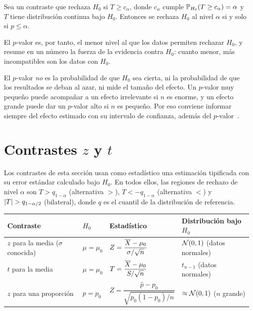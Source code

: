 \begin{proposicion}\label{prop:t5-pvalor}
Sea un contraste que rechaza $H_0$ si $T\ge c_\alpha$, donde $c_\alpha$ cumple $\mathbb{P}_{H_0}(T\ge c_\alpha)=\alpha$ y $T$ tiene distribución continua bajo $H_0$. Entonces se rechaza $H_0$ al nivel $\alpha$ si y solo si $p\le\alpha$.
\end{proposicion}

El $p$-valor es, por tanto, el menor nivel al que los datos permiten rechazar $H_0$, y resume en un número la fuerza de la evidencia contra $H_0$: cuanto menor, más incompatibles son los datos con $H_0$.

\begin{observacion}\label{obs:t5-pvalor}
El $p$-valor \emph{no} es la probabilidad de que $H_0$ sea cierta, ni la probabilidad de que los resultados se deban al azar, ni mide el tamaño del efecto. Un $p$-valor muy pequeño puede acompañar a un efecto irrelevante si $n$ es enorme, y un efecto grande puede dar un $p$-valor alto si $n$ es pequeño. Por eso conviene informar siempre del efecto estimado con su intervalo de confianza, además del $p$-valor~\cite[lecturas~17b y~20]{mit1805}.
\end{observacion}

\section{Contrastes \texorpdfstring{$z$}{z} y \texorpdfstring{$t$}{t}}

Los contrastes de esta sección usan como estadístico una estimación tipificada con su error estándar calculado bajo $H_0$. En todos ellos, las regiones de rechazo de nivel $\alpha$ son $T>q_{1-\alpha}$ (alternativa $>$), $T<-q_{1-\alpha}$ (alternativa $<$) y $\lvert T\rvert>q_{1-\alpha/2}$ (bilateral), donde $q$ es el cuantil de la distribución de referencia.

\begin{center}
\small
\begin{tabular}{@{}llll@{}}
\toprule
Contraste & $H_0$ & Estadístico & Distribución bajo $H_0$ \\
\midrule
$z$ para la media ($\sigma$ conocida) & $\mu=\mu_0$ & $Z=\dfrac{\overline{X}-\mu_0}{\sigma/\sqrt n}$ & $\mathcal{N}(0,1)$ (datos normales) \\[2ex]
$t$ para la media & $\mu=\mu_0$ & $T=\dfrac{\overline{X}-\mu_0}{S/\sqrt n}$ & $t_{n-1}$ (datos normales) \\[2ex]
$z$ para una proporción & $p=p_0$ & $Z=\dfrac{\widehat p-p_0}{\sqrt{p_0(1-p_0)/n}}$ & $\approx\mathcal{N}(0,1)$ ($n$ grande) \\
\bottomrule
\end{tabular}
\end{center}

